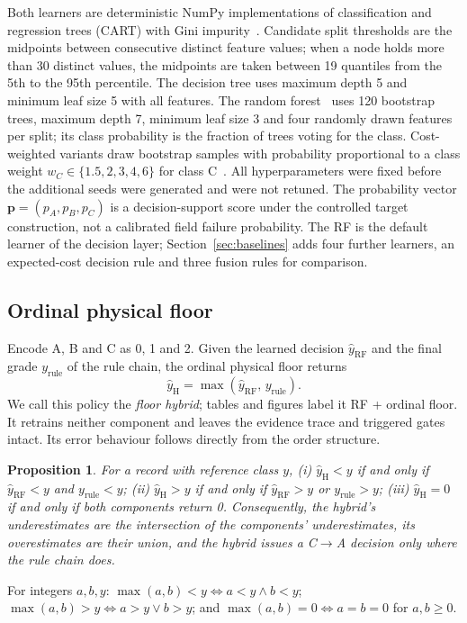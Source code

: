 \documentclass[journal]{IEEEtran}
\newcommand{\CtoA}{C$\rightarrow$A}
\newtheorem{proposition}{Proposition}
\begin{document}
Both learners are deterministic NumPy implementations of classification and regression trees (CART) with Gini impurity~\cite{Quinlan,Hastie2009}. Candidate split thresholds are the midpoints between consecutive distinct feature values; when a node holds more than 30 distinct values, the midpoints are taken between 19 quantiles from the 5th to the 95th percentile. The decision tree uses maximum depth 5 and minimum leaf size 5 with all features. The random forest~\cite{Breiman} uses 120 bootstrap trees, maximum depth 7, minimum leaf size 3 and four randomly drawn features per split; its class probability is the fraction of trees voting for the class. Cost-weighted variants draw bootstrap samples with probability proportional to a class weight $w_C\in\{1.5,2,3,4,6\}$ for class C~\cite{Elkan2001}. All hyperparameters were fixed before the additional seeds were generated and were not retuned. The probability vector $\mathbf p=(p_A,p_B,p_C)$ is a decision-support score under the controlled target construction, not a calibrated field failure probability. The RF is the default learner of the decision layer; Section~\ref{sec:baselines} adds four further learners, an expected-cost decision rule and three fusion rules for comparison.

\subsection{Ordinal physical floor}
\label{sec:floor}
Encode A, B and C as 0, 1 and 2. Given the learned decision $\hat y_{\mathrm{RF}}$ and the final grade $y_{\mathrm{rule}}$ of the rule chain, the ordinal physical floor returns
\begin{equation}
\hat y_{\mathrm{H}}=\max\left(\hat y_{\mathrm{RF}},\,y_{\mathrm{rule}}\right).
\label{eq:veto}
\end{equation}
We call this policy the \emph{floor hybrid}; tables and figures label it RF + ordinal floor. It retrains neither component and leaves the evidence trace and triggered gates intact. Its error behaviour follows directly from the order structure.

\begin{proposition}
\label{prop:floor}
For a record with reference class $y$, (i) $\hat y_{\mathrm{H}}<y$ if and only if $\hat y_{\mathrm{RF}}<y$ and $y_{\mathrm{rule}}<y$; (ii) $\hat y_{\mathrm{H}}>y$ if and only if $\hat y_{\mathrm{RF}}>y$ or $y_{\mathrm{rule}}>y$; (iii) $\hat y_{\mathrm{H}}=0$ if and only if both components return 0. Consequently, the hybrid's underestimates are the intersection of the components' underestimates, its overestimates are their union, and the hybrid issues a \CtoA{} decision only where the rule chain does.
\end{proposition}
\begin{IEEEproof}
For integers $a,b,y$: $\max(a,b)<y\Leftrightarrow a<y\wedge b<y$; $\max(a,b)>y\Leftrightarrow a>y\vee b>y$; and $\max(a,b)=0\Leftrightarrow a=b=0$ for $a,b\geq0$.
\end{IEEEproof}
\end{document}
